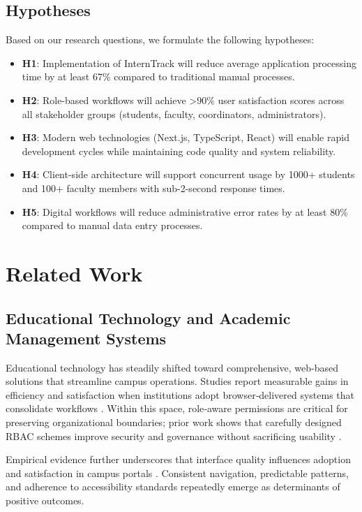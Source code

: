 \documentclass[conference]{IEEEtran}
\begin{document}
\subsection{Hypotheses}
Based on our research questions, we formulate the following hypotheses:

\begin{itemize}[leftmargin=*,nosep]
  \item \textbf{H1}: Implementation of InternTrack will reduce average application processing time by at least 67\% compared to traditional manual processes.
  \item \textbf{H2}: Role-based workflows will achieve >90\% user satisfaction scores across all stakeholder groups (students, faculty, coordinators, administrators).
  \item \textbf{H3}: Modern web technologies (Next.js, TypeScript, React) will enable rapid development cycles while maintaining code quality and system reliability.
  \item \textbf{H4}: Client-side architecture will support concurrent usage by 1000+ students and 100+ faculty members with sub-2-second response times.
  \item \textbf{H5}: Digital workflows will reduce administrative error rates by at least 80\% compared to manual data entry processes.
\end{itemize}

\section{Related Work}

\subsection{Educational Technology and Academic Management Systems}
Educational technology has steadily shifted toward comprehensive, web‑based solutions that streamline campus operations. Studies report measurable gains in efficiency and satisfaction when institutions adopt browser‑delivered systems that consolidate workflows \cite{smith2020web, johnson2019user}. Within this space, role‑aware permissions are critical for preserving organizational boundaries; prior work shows that carefully designed RBAC schemes improve security and governance without sacrificing usability \cite{chen2021role}.

Empirical evidence further underscores that interface quality influences adoption and satisfaction in campus portals \cite{williams2018user, thompson2022accessibility}. Consistent navigation, predictable patterns, and adherence to accessibility standards repeatedly emerge as determinants of positive outcomes.
\end{document}

